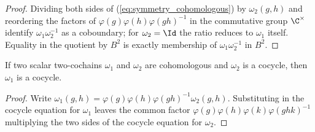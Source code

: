 \begin{proof}\leanok{}
    Dividing both sides of (\ref{eq:symmetry_cohomologous}) by
    $\omega_2(g,h)$ and reordering the factors of
    $\varphi(g)\varphi(h)\varphi(gh)^{-1}$ in the commutative group
    $\C^\times$ identify $\omega_1\omega_2^{-1}$ as a coboundary; for
    $\omega_2=\Id$ the ratio reduces to $\omega_1$ itself.
    Equality in the quotient by $B^2$ is exactly membership of
    $\omega_1\omega_2^{-1}$ in $B^2$.
\end{proof}

\begin{lemma}%
    \label{thm:cochain_coboundary_preserves_cocycle}
    \leanok
    If two scalar two-cochains $\omega_1$ and $\omega_2$ are
    cohomologous and $\omega_2$ is a cocycle, then $\omega_1$ is a cocycle.
\end{lemma}

\begin{proof}\leanok{}
    Write $\omega_1(g,h)=\varphi(g)\varphi(h)\varphi(gh)^{-1}\omega_2(g,h)$.
    Substituting in the cocycle equation for $\omega_1$ leaves the common
    factor $\varphi(g)\varphi(h)\varphi(k)\varphi(ghk)^{-1}$ multiplying
    the two sides of the cocycle equation for $\omega_2$.
\end{proof}

